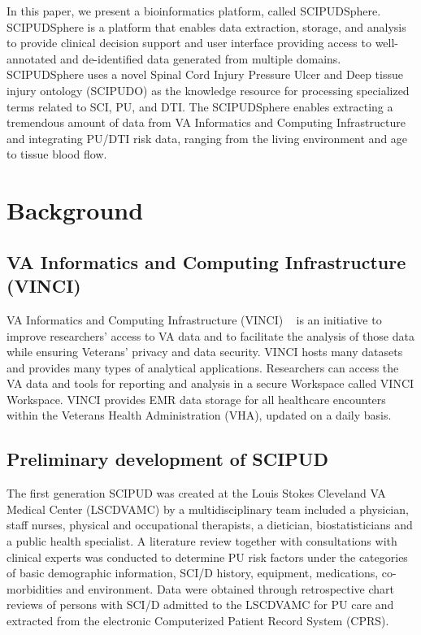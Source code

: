 \documentclass{amia}
\begin{document}
In this paper, we present a bioinformatics platform, called SCIPUDSphere. SCIPUDSphere is a platform that enables data extraction, storage, and analysis to provide clinical decision support and user interface providing access to well-annotated and de-identified data generated from multiple domains. SCIPUDSphere uses a novel Spinal Cord Injury Pressure Ulcer and Deep tissue injury ontology (SCIPUDO) as the knowledge resource for processing specialized terms related to SCI, PU, and DTI. The SCIPUDSphere enables extracting a tremendous amount of data from VA Informatics and Computing Infrastructure ~\cite{VINCI} and integrating PU/DTI risk data, ranging from the living environment and age to tissue blood flow. 

\section{Background}

\subsection{VA Informatics and Computing Infrastructure (VINCI)}
VA Informatics and Computing Infrastructure (VINCI) ~\cite{VINCI} is an initiative to improve researchers' access to VA data and to facilitate the analysis of those data while ensuring Veterans' privacy and data security. VINCI hosts many datasets and provides many types of analytical applications. Researchers can access the VA data and tools for reporting and analysis in a secure Workspace called VINCI Workspace. VINCI provides EMR data storage for all healthcare encounters within the Veterans Health Administration (VHA), updated on a daily basis. 

\subsection{Preliminary development of SCIPUD}
The first generation SCIPUD was created at the Louis Stokes Cleveland VA Medical Center (LSCDVAMC) by a multidisciplinary team included a physician, staff nurses, physical and occupational therapists, a dietician, biostatisticians and a public health specialist. A literature review \cite{literature_review} together with consultations with clinical experts was conducted to determine PU risk factors under the categories of basic demographic information, SCI/D history, equipment, medications, co-morbidities and environment. Data were obtained through retrospective chart reviews of persons with SCI/D admitted to the LSCDVAMC for PU care and extracted from the electronic Computerized Patient Record System (CPRS).
\end{document}
